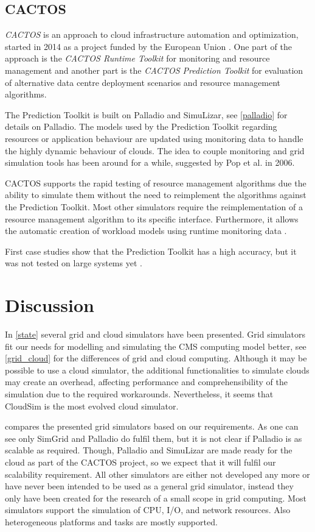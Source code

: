 \section{CACTOS}
\textit{CACTOS} is an approach to cloud infrastructure automation and optimization, started in 2014 as a project funded by the European Union \cite{cactos}.
One part of the approach is the \textit{CACTOS Runtime Toolkit} for monitoring and resource management and another part is the \textit{CACTOS Prediction Toolkit} for evaluation of alternative data centre deployment scenarios and resource management algorithms.

The Prediction Toolkit is built on Palladio and SimuLizar, see \cref{palladio} for details on Palladio.
The models used by the Prediction Toolkit regarding resources or application behaviour are updated using monitoring data to handle the highly dynamic behaviour of clouds.
The idea to couple monitoring and grid simulation tools has been around for a while, suggested by Pop et al. \cite{1698650} in 2006.

CACTOS supports the rapid testing of resource management algorithms due the ability to simulate them without the need to reimplement the algorithms against the Prediction Toolkit. Most other simulators require the reimplementation of a resource management algorithm to its specific interface. Furthermore, it allows the automatic creation of workload models  using runtime monitoring data \cite{rapidtesting}.

First case studies show that the Prediction Toolkit has a high accuracy, but it was not tested on large systems yet \cite{rapidtesting}.

\chapter{Discussion}
\label{dis}
In \cref{state} several grid and cloud simulators have been presented. Grid simulators fit our needs for modelling and simulating the CMS computing model better, see \cref{grid_cloud} for the differences of grid and cloud computing. Although it may be possible to use a cloud simulator, the additional functionalities to simulate clouds may create an overhead, affecting performance and comprehensibility of the simulation due to the required workarounds. Nevertheless, it seems that CloudSim is the most evolved cloud simulator.

 compares the presented grid simulators based on our requirements. As one can see only SimGrid and Palladio do fulfil them, but it is not clear if Palladio is as scalable as required. Though, Palladio and SimuLizar are made ready for the cloud as part of the CACTOS project, so we expect that it will fulfil our scalability requirement. All other simulators are either not developed any more or have never been intended to be used as a general grid simulator, instead they only have been created for the research of a small scope in grid computing. Most simulators support the simulation of CPU, I/O, and network resources. Also heterogeneous platforms and tasks are mostly supported.

